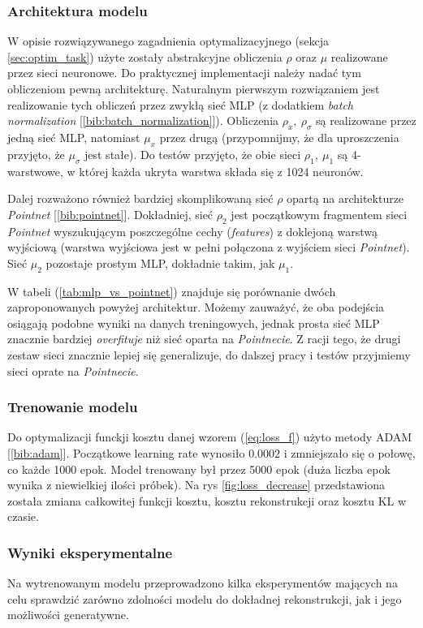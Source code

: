 \documentclass[12pt]{extarticle}
\begin{document}
\subsubsection{Architektura modelu}
W opisie rozwiązywanego zagadnienia optymalizacyjnego (sekcja \ref{sec:optim_task}) użyte zostały
abstrakcyjne obliczenia $\rho$ oraz $\mu$ realizowane przez sieci neuronowe. Do praktycznej implementacji
należy nadać tym obliczeniom pewną architekturę. Naturalnym pierwszym rozwiązaniem jest realizowanie
tych obliczeń przez zwykłą sieć MLP (z dodatkiem \textit{batch normalization} [\ref{bib:batch_normalization}]).
Obliczenia $\rho_x,\ \rho_\sigma$ są realizowane przez jedną sieć MLP, natomiast $\mu_x$ przez drugą (przypomnijmy,
że dla uproszczenia przyjęto, że $\mu_\sigma$ jest stałe).
Do testów przyjęto, że obie sieci $\rho_1,\ \mu_1$ są 4-warstwowe, w której każda ukryta warstwa składa się z 1024 neuronów.

Dalej rozważono również bardziej skomplikowaną sieć $\rho$ opartą na architekturze \textit{Pointnet} [\ref{bib:pointnet}].
Dokładniej, sieć $\rho_2$ jest początkowym fragmentem sieci \textit{Pointnet} wyszukującym poszczególne cechy (\textit{features})
z doklejoną warstwą wyjściową (warstwa wyjściowa jest w pełni połączona z wyjściem sieci \textit{Pointnet}).
Sieć $\mu_2$ pozostaje prostym MLP, dokładnie takim, jak $\mu_1$.

W tabeli (\ref{tab:mlp_vs_pointnet}) znajduje się porównanie dwóch zaproponowanych powyżej architektur. Możemy zauważyć,
że oba podejścia osiągają podobne wyniki na danych treningowych, jednak prosta sieć MLP znacznie bardziej \textit{overfituje}
niż sieć oparta na \textit{Pointnecie}. Z racji tego, że drugi zestaw sieci znacznie lepiej się generalizuje, do dalszej
pracy i testów przyjmiemy sieci oprate na \textit{Pointnecie}.

\subsubsection{Trenowanie modelu}
Do optymalizacji funckji kosztu danej wzorem (\ref{eq:loss_f}) użyto metody ADAM [\ref{bib:adam}]. Początkowe learning rate
wynosiło $0.0002$ i zmniejszało się o połowę, co każde 1000 epok. Model trenowany był przez 5000 epok (duża liczba epok
wynika z niewielkiej ilości próbek). Na rys \ref{fig:loss_decrease} przedstawiona została zmiana całkowitej funkcji kosztu,
kosztu rekonstrukcji oraz kosztu KL w czasie.

\subsubsection{Wyniki eksperymentalne}
Na wytrenowanym modelu przeprowadzono kilka eksperymentów mających na celu sprawdzić zarówno zdolności modelu do dokładnej
rekonstrukcji, jak i jego możliwości generatywne.
\end{document}
